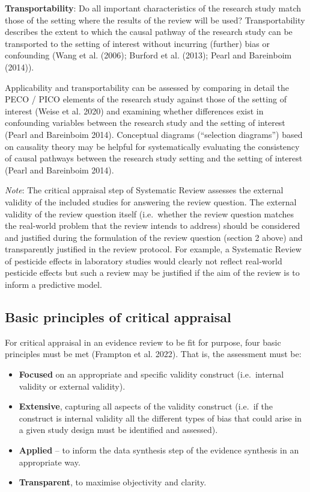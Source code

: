 \documentclass[
  letterpaper,
  DIV=11,
  numbers=noendperiod]{scrreprt}
\begin{document}
\textbf{Transportability}: Do all important characteristics of the
research study match those of the setting where the results of the
review will be used? Transportability describes the extent to which the
causal pathway of the research study can be transported to the setting
of interest without incurring (further) bias or confounding (Wang et al.
(2006); Burford et al. (2013); Pearl and Bareinboim (2014)).

Applicability and transportability can be assessed by comparing in
detail the PECO / PICO elements of the research study against those of
the setting of interest (Weise et al. 2020) and examining whether
differences exist in confounding variables between the research study
and the setting of interest (Pearl and Bareinboim 2014). Conceptual
diagrams (``selection diagrams'') based on causality theory may be
helpful for systematically evaluating the consistency of causal pathways
between the research study setting and the setting of interest (Pearl
and Bareinboim 2014).

\emph{Note}: The critical appraisal step of Systematic Review assesses
the external validity of the included studies for answering the review
question. The external validity of the review question itself
(i.e.~whether the review question matches the real-world problem that
the review intends to address) should be considered and justified during
the formulation of the review question (section 2 above) and
transparently justified in the review protocol. For example, a
Systematic Review of pesticide effects in laboratory studies would
clearly not reflect real-world pesticide effects but such a review may
be justified if the aim of the review is to inform a predictive model.

\subsection{Basic principles of critical
appraisal}\label{basic-principles-of-critical-appraisal}

For critical appraisal in an evidence review to be fit for purpose, four
basic principles must be met (Frampton et al. 2022). That is, the
assessment must be:

\begin{itemize}
\item
  \textbf{Focused} on an appropriate and specific validity construct
  (i.e.~internal validity or external validity).
\item
  \textbf{Extensive}, capturing all aspects of the validity construct
  (i.e.~if the construct is internal validity all the different types of
  bias that could arise in a given study design must be identified and
  assessed).
\item
  \textbf{Applied} -- to inform the data synthesis step of the evidence
  synthesis in an appropriate way.
\item
  \textbf{Transparent}, to maximise objectivity and clarity.
\end{itemize}
\end{document}
